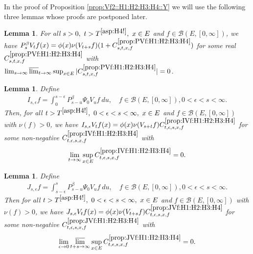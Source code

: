 \documentclass[12pt,a4paper]{amsart}
\numberwithin{equation}{section}
\theoremstyle{plain}
\newtheorem{lem}[thm]{Lemma}
\theoremstyle{definition}
\theoremstyle{remark}
\begin{document}
	In the proof of Proposition \ref{prop:Vf2::H1:H2:H3:H4::Y} we will use the following three lemmas whose proofs are postponed later.

\begin{lem} \label{prop:PVf:H1:H2:H3:H4}
	For all $s> 0,~t> T^{\eqref{asp:H4!}},~ x\in E$ and $f\in \mathcal B(E,[0,\infty])$, we have $P_s^\beta V_t f(x) = \phi(x) \nu(V_{t+s}f) (1+C^{\ref{prop:PVf:H1:H2:H3:H4}}_{s,t,x,f})$ for some real $C^{\ref{prop:PVf:H1:H2:H3:H4}}_{s,t,x,f}$ with $\lim_{s\to \infty} \varlimsup_{t\to \infty} \sup_{x\in E} |C^{\ref{prop:PVf:H1:H2:H3:H4}}_{s,t,x,f}| = 0$.
\end{lem}

\begin{lem} \label{prop:IVf:H1:H2:H3:H4}
	Define
\begin{align}
	I_{s,\epsilon} f
 	= \int_0^{s - \epsilon} P_{s - u}^\beta \Psi_0 V_u f ~du,
 	\quad f\in \mathcal B(E,[0,\infty]),0 < \epsilon < s < \infty.
\end{align}
	Then, for all $t> T^{\eqref{asp:H4!}},~0<\epsilon<s< \infty,~x\in E$ and $f\in \mathcal B(E,[0,\infty])$ with $\nu(f)>0$, we have $I_{s,\epsilon}V_t f(x) = \phi(x) \nu(V_{s+t} f) C^{\ref{prop:IVf:H1:H2:H3:H4}}_{t,\epsilon, s, x,f}$ for some non-negative $C^{\ref{prop:IVf:H1:H2:H3:H4}}_{t,\epsilon, s, x,f}$ with \[\lim_{t\to \infty} \sup_{x\in E} C^{\ref{prop:IVf:H1:H2:H3:H4}}_{t,\epsilon, s, x,f} = 0.\]
\end{lem}

\begin{lem} \label{prop:JVf:H1:H2:H3:H4}
	Define
\begin{align}
	J_{s,\epsilon} f
 	= \int_{s-\epsilon}^s P_{s-u}^\beta \Psi_0 V_u f ~du,
 	\quad f\in \mathcal B(E,[0,\infty]), 0< \epsilon < s< \infty.
\end{align}
	Then for all $t>T^{\eqref{asp:H4!}},~0<\epsilon<s< \infty,~x\in E$ and $f\in \mathcal B(E,[0,\infty])$ with $\nu(f)>0$, we have $ J_{s,\epsilon} V_tf(x) = \phi(x) \nu(V_{t+s}f) C^{\ref{prop:JVf:H1:H2:H3:H4}}_{t,\epsilon,s,x,f}$ for some non-negative $C^{\ref{prop:JVf:H1:H2:H3:H4}}_{t,\epsilon,s,x,f}$ with \[\lim_{\epsilon \to 0}\varlimsup_{t+s\to \infty} \sup_{x\in E} C^{\ref{prop:JVf:H1:H2:H3:H4}}_{t,\epsilon,s,x,f} =0.\]
\end{lem}
\end{document}
